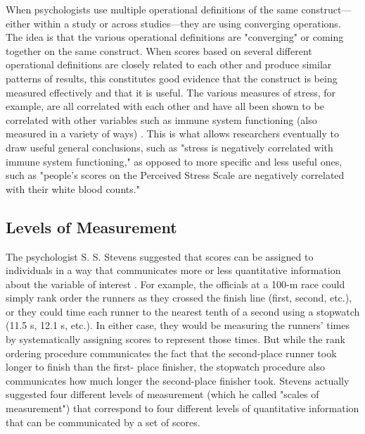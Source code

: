 When psychologists use multiple operational definitions of the same construct—either within a study or across studies—they are using converging operations. The idea is that the various operational definitions are "converging" or coming together on the same construct. When scores based on several different operational definitions are closely related to each other and produce similar patterns of results, this constitutes good evidence that the construct is being measured effectively and that it is useful. The various measures of stress, for example, are all correlated with each other and have all been shown to be correlated with other variables such as immune system functioning (also measured in a variety of ways) \citep{segerstrom_psychological_2004}. This is what allows researchers eventually to draw useful general conclusions, such as "stress is negatively correlated with immune system functioning," as opposed to more specific and less useful ones, such as "people's scores on the Perceived Stress Scale are negatively correlated with their white blood counts."

\subsection{Levels of Measurement}

The psychologist S. S. Stevens suggested that scores can be assigned to individuals in a way that communicates more or less quantitative information about the variable of interest \citep{stevens_theory_1946}. For example, the officials at a 100-m race could simply rank order the runners as they crossed the finish line (first, second, etc.), or they could time each runner to the nearest tenth of a second using a stopwatch (11.5 s, 12.1 s, etc.). In either case, they would be measuring the runners' times by systematically assigning scores to represent those times. But while the rank ordering procedure communicates the fact that the second-place runner took longer to finish than the first- place finisher, the stopwatch procedure also communicates how much longer the second-place finisher took. Stevens actually suggested four different levels of measurement (which he called "scales of measurement") that correspond to four different levels of quantitative information that can be communicated by a set of scores.


